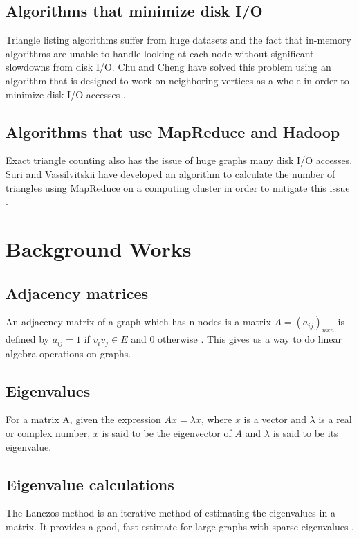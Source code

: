 \documentclass{acm_proc_article-sp}
\begin{document}
\subsection{Algorithms that minimize disk I/O}
Triangle listing algorithms suffer from huge datasets and the fact that
in-memory algorithms are unable to handle looking at each node without
significant slowdowns from disk I/O. Chu and Cheng have solved this problem
using an algorithm that is designed to work on neighboring vertices as a whole
in order to minimize disk I/O accesses \cite{chu}.

\subsection{Algorithms that use MapReduce and Hadoop}
Exact triangle counting also has the issue of huge graphs many disk I/O
accesses. Suri and Vassilvitskii have developed an algorithm to calculate the
number of triangles using MapReduce on a computing cluster in order to mitigate
this issue \cite{suri}.

\section{Background Works}

\subsection{Adjacency matrices}
An adjacency matrix of a graph which has n nodes is a matrix $A = 
(a_{ij})_{nxn}$ is defined by $a_{ij} = 1$ if $v_iv_j \in E$ and $0$ otherwise
\cite{diestel}.  This gives us a way to do linear algebra operations on graphs.

\subsection{Eigenvalues}
For a matrix A, given the expression $Ax = \lambda x$, where $x$ is a vector and
$\lambda$ is a real or complex number, $x$ is said to be the eigenvector of $A$
and $\lambda$ is said to be its eigenvalue. \cite{lovasz}

\subsection{Eigenvalue calculations}
The Lanczos method is an iterative method of estimating the eigenvalues in a
matrix. It provides a good, fast estimate for large graphs with sparse
eigenvalues \cite{golub}.
\end{document}
